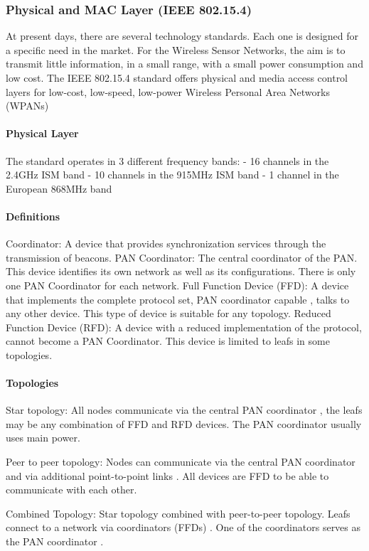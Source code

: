 \subsubsection{Physical and MAC Layer (IEEE 802.15.4)}
At present days,
	there are several technology standards.
Each one is designed for a specific need in the market.
For the Wireless Sensor Networks,
	the aim is to transmit little information,
	in a small range,
	with a small power consumption and low cost.
The IEEE 802.15.4 standard offers physical and media access control layers for low-cost,
	low-speed,
	low-power Wireless Personal Area Networks (WPANs)

\paragraph{Physical Layer}
The standard operates in 3 different frequency bands:
- 16 channels in the 2.4GHz ISM band
- 10 channels in the 915MHz ISM band
- 1 channel in the European 868MHz band


\paragraph{Definitions}
Coordinator:
	A device that provides synchronization services through the transmission of beacons.
PAN Coordinator:
	The central coordinator of the PAN.
This device identifies its own network as well as its configurations.
There is only one PAN Coordinator for each network.
Full Function Device (FFD):
	A device that implements the complete protocol set,
	PAN coordinator capable ,
	talks to any other device.
This type of device is suitable for any topology.
Reduced Function Device (RFD):
	A device with a reduced implementation of the protocol,
	cannot become a PAN Coordinator.
This device is limited to leafs in some topologies.

\paragraph{Topologies}
Star topology:
	All nodes communicate via the central PAN coordinator ,
	the leafs may be any combination of FFD and RFD devices.
The PAN coordinator usually uses main power.

Peer to peer topology:
	Nodes can communicate via the central PAN coordinator and via additional point-to-point links .
All devices are FFD to be able to communicate with each other.


Combined Topology:
	Star topology combined with peer-to-peer topology.
Leafs connect to a network via coordinators (FFDs) .
One of the coordinators serves as the PAN coordinator .


